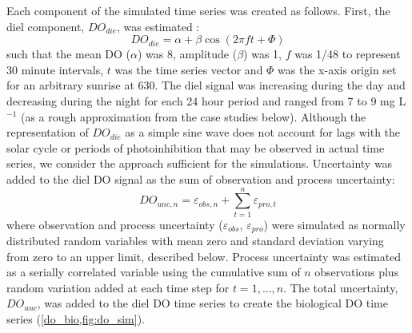\documentclass[letterpaper,12pt,oneside]{article}\usepackage[]{graphicx}\usepackage[]{color}
\begin{document}
Each component of the simulated time series was created as follows.  First, the diel component, $DO_{die}$, was estimated \citep{Cryer08}:
\begin{equation} \label{do_sin}
DO_{die} = \alpha + \beta\cos\left(2\pi ft + \Phi\right)
\end{equation}
such that the mean DO ($\alpha$) was 8, amplitude ($\beta$) was 1, $f$ was 1/48 to represent 30 minute intervals, $t$ was the time series vector and $\Phi$ was the x-axis origin set for an arbitrary sunrise at 630.  The diel signal was increasing during the day and decreasing during the night for each 24 hour period and ranged from 7 to 9 mg L$^{-1}$ (as a rough approximation from the case studies below).  Although the representation of $DO_{die}$ as a simple sine wave does not account for lags with the solar cycle or periods of photoinhibition that may be observed in actual time series, we consider the approach sufficient for the simulations.  Uncertainty was added to the diel \ac{DO} signal as the sum of observation and process uncertainty:
\begin{equation} \label{do_unc_n}
DO_{unc, n} = \varepsilon_{obs, n} + \sum_{t = 1}^{n} \varepsilon_{pro, t}
\end{equation}
where observation and process uncertainty ($\varepsilon_{obs}$, $\varepsilon_{pro}$) were simulated as normally distributed random variables with mean zero and standard deviation varying from zero to an upper limit, described below.  Process uncertainty was estimated as a serially correlated variable using the cumulative sum of $n$ observations plus random variation added at each time step for $t = 1, ..., n$.  The total uncertainty, $DO_{unc}$, was added to the diel \ac{DO} time series to create the biological \ac{DO} time series (\cref{do_bio,fig:do_sim}).
\end{document}
